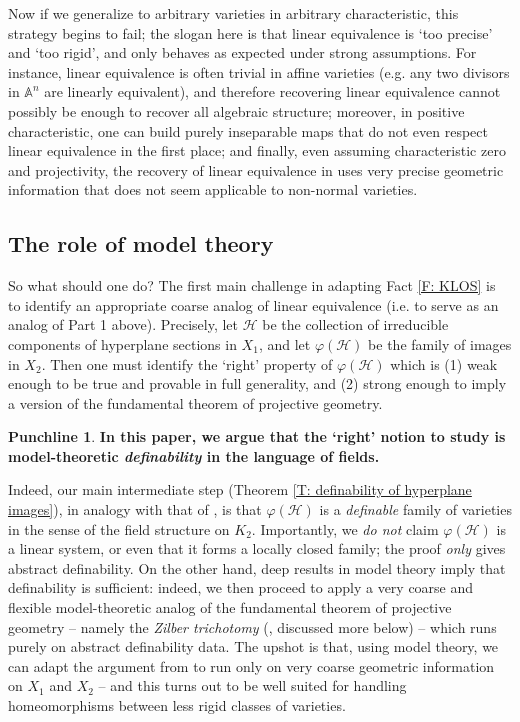 \documentclass{amsart}
\theoremstyle{definition}
\newtheorem{punchline}[theorem]{Punchline}
\begin{document}
Now if we generalize to arbitrary varieties in arbitrary characteristic, this strategy begins to fail; the slogan here is that linear equivalence is `too precise' and `too rigid', and only behaves as expected under strong assumptions. For instance, linear equivalence is often trivial in affine varieties (e.g. any two divisors in $\mathbb A^n$ are linearly equivalent), and therefore recovering linear equivalence cannot possibly be enough to recover all algebraic structure; moreover, in positive characteristic, one can build purely inseparable maps that do not even respect linear equivalence in the first place; and finally, even assuming characteristic zero and projectivity, the recovery of linear equivalence in \cite{KLOS} uses very precise geometric information that does not seem applicable to non-normal varieties.

\subsection{The role of model theory}

So what should one do? The first main challenge in adapting Fact \ref{F: KLOS} is to identify an appropriate coarse analog of linear equivalence (i.e. to serve as an analog of Part 1 above). Precisely, let $\mathcal H$ be the collection of irreducible components of hyperplane sections in $X_1$, and let $\varphi(\mathcal H)$ be the family of images in $X_2$. Then one must identify the `right' property of $\varphi(\mathcal H)$ which is (1) weak enough to be true and provable in full generality, and (2) strong enough to imply a version of the fundamental theorem of projective geometry.

\begin{punchline} \textbf{In this paper, we argue that the `right' notion to study is model-theoretic \textit{definability} in the language of fields.}
\end{punchline}

Indeed, our main intermediate step (Theorem \ref{T: definability of hyperplane images}), in analogy with that of \cite{KLOS}, is that $\varphi(\mathcal H)$ is a \textit{definable} family of varieties in the sense of the field structure on $K_2$. Importantly, we \textit{do not} claim $\varphi(\mathcal H)$ is a linear system, or even that it forms a locally closed family; the proof \textit{only} gives abstract definability. On the other hand, deep results in model theory imply that definability is sufficient: indeed, we then proceed to apply a very coarse and flexible model-theoretic analog of the fundamental theorem of projective geometry -- namely the \textit{Zilber trichotomy} (\cite{CasHasYe}, discussed more below) -- which runs purely on abstract definability data. The upshot is that, using model theory, we can adapt the argument from \cite{KLOS} to run only on very coarse geometric information on $X_1$ and $X_2$ -- and this turns out to be well suited for handling homeomorphisms between less rigid classes of varieties.
\end{document}
